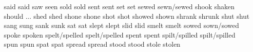 	            {said}{}	            {said}{}                {}{}
	            {saw}{}	                {seen}{}                {}{}
	            {sold}{}	            {sold}{}                {}{}
	            {sent}{}	            {sent}{}                {}{}
	            {set}{}	                {set}{}                 {}{}
	            {sewed}{}	            {sewn/sewed}{}          {}{}
	            {shook}{}	            {shaken}{}              {}{}
	            {should}{}	            {...}{}                 {}{}
	            {shed}{}	            {shed}{}                {}{}
	            {shone}{}	            {shone}{}               {}{}
	            {shot}{}	            {shot}{}                {}{}
	            {showed}{}	            {shown}{}               {}{}
	            {shrank}{}	            {shrunk}{}              {}{}
	            {shut}{}	            {shut}{}                {}{}
	            {sang}{}	            {sung}{}                {}{}
	            {sank}{}	            {sunk}{}                {}{}
	            {sat}{}	                {sat}{}                 {}{}
	            {slept}{}	            {slept}{}               {}{}
	            {slid}{}	            {slid}{}                {}{}
	            {smelt}{}	            {smelt}{}               {}{}
	            {sowed}{}	            {sown/sowed}{}          {}{}
	            {spoke}{}	            {spoken}{}              {}{}
	            {spelt/spelled}{}	    {spelt/spelled}{}       {}{}
	            {spent}{}	            {spent}{}               {}{}
	            {spilt/spilled}{}	    {spilt/spilled}{}       {}{}
	            {spun}{}	            {spun}{}                {}{}
	            {spat}{}	            {spat}{}                {}{}
	            {spread}{}	            {spread}{}              {}{}
	            {stood}{}	            {stood}{}               {}{}
	            {stole}{}	            {stolen}{}              {}{}
